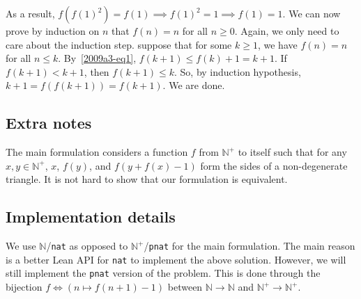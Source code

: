 \documentclass{article}
\newcommand{\N}{\mathbb{N}}
\begin{document}
As a result, $f(f(1)^2) = f(1) \implies f(1)^2 = 1 \implies f(1) = 1$.
We can now prove by induction on $n$ that $f(n) = n$ for all $n \geq 0$.
Again, we only need to care about the induction step.
suppose that for some $k \geq 1$, we have $f(n) = n$ for all $n \leq k$.
By~\eqref{2009a3-eq1}, $f(k + 1) \leq f(k) + 1 = k + 1$.
If $f(k + 1) < k + 1$, then $f(k + 1) \leq k$.
So, by induction hypothesis, $k + 1 = f(f(k + 1)) = f(k + 1)$.
We are done.



\subsection*{Extra notes}

The main formulation considers a function $f$ from $\N^+$ to itself such that for any $x, y \in \N^+$, $x$, $f(y)$, and $f(y + f(x) - 1)$ form the sides of a non-degenerate triangle.
It is not hard to show that our formulation is equivalent.



\subsection*{Implementation details}

We use $\N$/\texttt{nat} as opposed to $\N^+$/\texttt{pnat} for the main formulation.
The main reason is a better Lean API for \texttt{nat} to implement the above solution.
However, we will still implement the \texttt{pnat} version of the problem.
This is done through the bijection $f \iff (n \mapsto f(n + 1) - 1)$ between $\N \to \N$ and $\N^+ \to \N^+$.
\end{document}
